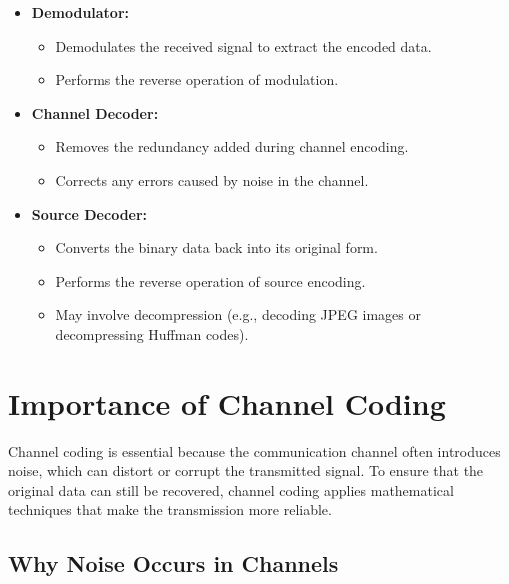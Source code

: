 \documentclass[11pt,a4paper]{book}
\newenvironment{infobox}[1][Information]{
    \begin{tcolorbox}[
        enhanced,
        breakable,
        colback=mintgreen!10,
        colframe=mintgreen!200,
        title=#1,
        fonttitle=\bfseries,
        sharp corners,
        boxrule=0.8pt,
        left=8pt,
        right=8pt,
        top=6pt,
        bottom=6pt
    ]
}{
    \end{tcolorbox}
}
\begin{document}
\begin{itemize}
    \item \textbf{Demodulator:}
          \begin{itemize}
              \item Demodulates the received signal to extract the encoded data.
              \item Performs the reverse operation of modulation.
          \end{itemize}

    \item \textbf{Channel Decoder:}
          \begin{itemize}
              \item Removes the redundancy added during channel encoding.
              \item Corrects any errors caused by noise in the channel.
          \end{itemize}

    \item \textbf{Source Decoder:}
          \begin{itemize}
              \item Converts the binary data back into its original form.
              \item Performs the reverse operation of source encoding.
              \item May involve decompression (e.g., decoding JPEG images or decompressing Huffman codes).
          \end{itemize}
\end{itemize}

\section{Importance of Channel Coding}

\begin{infobox}[Channel coding]
    Channel coding is essential because the communication channel often introduces noise, which can distort or corrupt the transmitted signal. To ensure that the original data can still be recovered, channel coding applies mathematical techniques that make the transmission more reliable.
\end{infobox}

\subsection{Why Noise Occurs in Channels}
\end{document}
